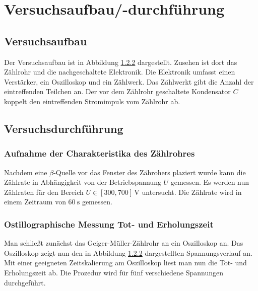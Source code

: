 \section{Versuchsaufbau/-durchführung}

\subsection{Versuchsaufbau}

Der Versuchsaufbau ist in Abbildung \ref{} dargestellt.
Zusehen ist dort das Zählrohr und die nachgeschaltete Elektronik.
Die Elektronik umfasst einen Verstärker, ein Oszilloskop und
ein Zählwerk. Das Zählwerkt gibt die Anzahl der eintreffenden Teilchen
an. Der vor dem Zählrohr geschaltete Kondensator $C$ koppelt den eintreffenden
Stromimpuls vom Zählrohr ab.

\subsection{Versuchsdurchführung}

\subsubsection{Aufnahme der Charakteristika des Zählrohres}

Nachdem eine $\beta$-Quelle vor das Fenster des Zährohers plaziert wurde
kann die Zählrate in Abhängigkeit von der Betriebspannung $U$ gemessen.
Es werden nun Zählraten für den Bereich $U\in\left[300, 700\right] \, \si{\volt}$
untersucht. Die Zählrate wird in einem Zeitraum von $\SI{60}{\second}$ gemessen.


\subsubsection{Ostillographische Messung Tot- und Erholungszeit}
Man schließt zunächst das Geiger-Müller-Zählrohr an ein
Oszilloskop an. Das Oszilloskop zeigt nun den in Abbildung \ref{}
dargestellten Spannungsverlauf an. Mit einer geeigneten Zeitskalierung am Oszilloskop
liest man nun die Tot- und Erholungszeit ab.
Die Prozedur wird für fünf verschiedene Spannungen durchgeführt.

